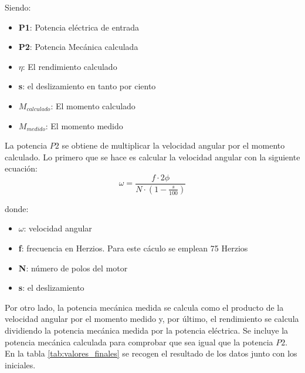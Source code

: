 \documentclass[12pt]{article}
\begin{document}
Siendo:
\begin{itemize}
    \item \textbf{P1}: Potencia eléctrica de entrada
    \item \textbf{P2}: Potencia Mecánica calculada
    \item \textbf{$\eta$}: El rendimiento calculado
    \item \textbf{s}: el deslizamiento en tanto por ciento
    \item \textbf{$M_{calculado}$}: El momento calculado
    \item  \textbf{$M_{medido}$}: El momento medido
\end{itemize}

La potencia $P2$ se obtiene de multiplicar la velocidad angular por el momento calculado. Lo primero que se hace es calcular la velocidad angular con la siguiente ecuación:
\begin{equation}
{\omega = \frac{f \cdot 2 \phi }{N \cdot \left(1 - \frac{s}{100}\right)}}
\label{eqn:velocidad_angular}
\end{equation}

donde:
\begin{itemize}
    \item \textbf{$\omega$}: velocidad angular
    \item \textbf{f}: frecuencia en Herzios. Para este cáculo se emplean 75 Herzios
    \item \textbf{N}: número de polos del motor
    \item \textbf{s}: el deslizamiento
\end{itemize}
Por otro lado, la potencia mecánica medida se calcula como el producto de la velocidad angular por el momento medido y, por último, el rendimiento se calcula dividiendo la potencia mecánica medida por la potencia eléctrica. Se incluye la potencia mecánica calculada para comprobar que sea igual que la potencia $P2$. En la tabla \ref{tab:valores_finales} se recogen el resultado de los datos junto con los iniciales.
\end{document}
